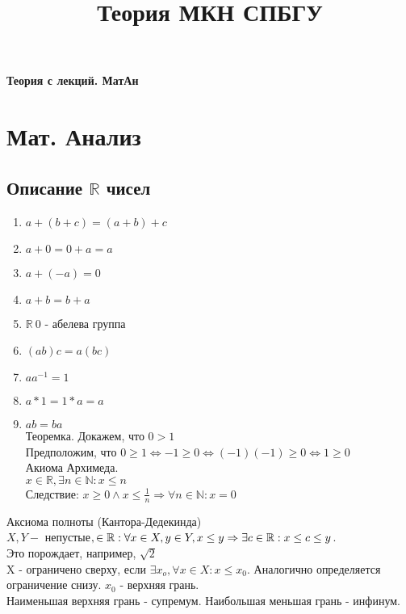 \documentclass{article}
\title{Теория МКН СПБГУ}
\begin{document}
\begin{titlepage}
\begin{center}
{\LARGE \textbf{Теория с лекций. МатАн}}
\end{center}
\begin{figure}[h]
\centering
\end{figure}
\end{titlepage}

\begin{titlepage}
\clearpage
\textcolor{blue}{\tableofcontents}
\end{titlepage}

\section{Мат. Анализ}
\subsection{Описание $\mathbb{R}$ чисел}
\begin{enumerate}
\item $a+(b+c) = (a+b)+c$
\item $a+0=0+a=a$
\item $a+(-a)=0$
\item $a+b=b+a$
\item $\mathbb{R} \ 0$ - абелева группа
\item $(ab)c=a(bc)$
\item $aa^{-1}=1$
\item $a*1=1*a=a$
\item $ab=ba$\\
Теоремка. Докажем, что $0>1$\\
Предположим, что $0 \geq 1 \Leftrightarrow -1 \geq 0 \Leftrightarrow (-1)(-1) \geq 0 \Leftrightarrow 1 \geq 0$\\
Акиома Архимеда.\\
$x \in \mathbb{R}, \exists n \in \mathbb{N}:x \leq n$\\
Следствие: $x \geq 0 \wedge x \leq \frac{1}{n} \Rightarrow \forall n \in \mathbb{N}: x=0 $\\
\end{enumerate}
Аксиома полноты (Кантора-Дедекинда)\\
$X,Y -$ непустые$, \in \mathbb{R}:\\
\forall x \in X, y \in Y, x \leq y \Rightarrow \exists c \in \mathbb{R}: x \leq c \leq y$.\\
Это порождает, например, $\sqrt{2}$\\
X - ограничено сверху, если $\exists x_o, \forall x \in X: x \leq x_0$. Аналогично определяется ограничение снизу. $x_0$ - верхняя грань.\\
Наименьшая верхняя грань - супремум. Наибольшая меньшая грань - инфинум.
\end{document}

